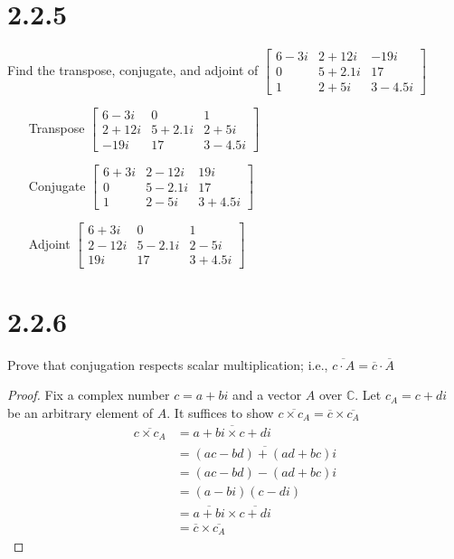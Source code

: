 \documentclass[11pt]{article}
\begin{document}
\newpage

\section{2.2.5} Find the transpose, conjugate, and adjoint of 
$\begin{bmatrix}
	6 - 3i & 2 + 12i & -19i \\
	0 & 5 + 2.1i & 17 \\
	1 & 2 + 5i & 3 - 4.5i 
\end{bmatrix}$

\begin{enumerate}
\item[Transpose]
$\begin{bmatrix}
	6 - 3i   & 0        & 1 \\
	2 + 12i  & 5 + 2.1i & 2 + 5i  \\
	-19i     & 17  & 3 - 4.5i 
\end{bmatrix}$
		\vspace{0.3in}
\item[Conjugate]
$\begin{bmatrix}
	6 + 3i & 2 - 12i & 19i \\
	0 & 5 - 2.1i & 17 \\
	1 & 2 - 5i & 3 + 4.5i 
\end{bmatrix}$

		\vspace{0.3in}
\item[Adjoint]
$\begin{bmatrix}
	6 + 3i   & 0        & 1 \\
	2 - 12i  & 5 - 2.1i & 2 - 5i  \\
	19i     & 17  & 3 + 4.5i 
\end{bmatrix}$
\end{enumerate}


\section{2.2.6} Prove that conjugation respects scalar multiplication; i.e., $\overline{c \cdot A} = \overline{c} \cdot \overline{A}$

\begin{proof}
	Fix a complex number $c = a+bi$ and a vector $A$ over $\mathbb{C}$. 
	Let $c_A = c+di$ be an arbitrary element of $A$. It suffices to show $\overline{c\times c_A} = \overline{c} \times \overline{c_A}$
	\begin{align*}
		\overline{c \times c_A} 
		&= \overline{a+bi \times c+di} \\
		&= \overline{(ac-bd) + (ad + bc)i} \\
		&= (ac-bd) - (ad + bc)i \\
		&= (a-bi)(c-di) \\
		&= \overline{a+bi} \times \overline{c+di} \\
		&= \overline{c} \times \overline{c_A}
	\end{align*}
\end{proof}
\end{document}
